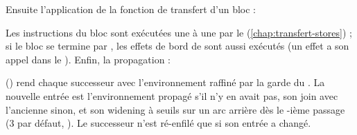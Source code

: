 Ensuite l'application de la fonction de transfert d'un bloc :


Les instructions du bloc sont exécutées une à une par le 
(\cref{chap:transfert-stores}) ; si le bloc se termine par , les
effets de bord de  sont aussi exécutés (un effet
 a son appel dans le ). Enfin, la
propagation :


 () rend chaque
successeur avec l'environnement raffiné par la garde du . La
nouvelle entrée est l'environnement propagé s'il n'y en avait pas, son join
avec l'ancienne sinon, et son widening à seuils sur un arc arrière dès le
-ième passage (3 par défaut,
). Le successeur n'est ré-enfilé que si son
entrée a changé.

